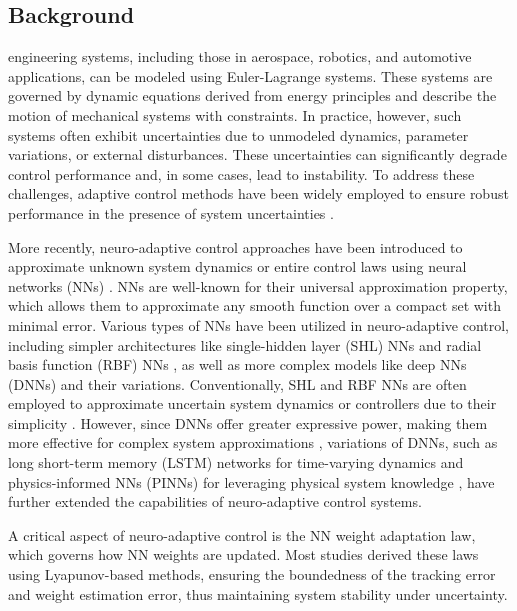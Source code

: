\documentclass[journal]{IEEEtran}
\begin{document}
\subsection{Background}

 engineering systems, including those in aerospace, robotics, and automotive applications, can be modeled using Euler-Lagrange systems. 
These systems are governed by dynamic equations derived from energy principles and describe the motion of mechanical systems with constraints. 
In practice, however, such systems often exhibit uncertainties due to unmodeled dynamics, parameter variations, or external disturbances. 
These uncertainties can significantly degrade control performance and, in some cases, lead to instability. 
To address these challenges, adaptive control methods have been widely employed to ensure robust performance in the presence of system uncertainties \cite{Ioannou:2006aa, Tao:2003aa}.

More recently, neuro-adaptive control approaches have been introduced to approximate unknown system dynamics or entire control laws using neural networks (NNs) \cite{Farrell:2006aa}. 
NNs are well-known for their universal approximation property, which allows them to approximate any smooth function over a compact set with minimal error. 
Various types of NNs have been utilized in neuro-adaptive control, including simpler architectures like single-hidden layer (SHL) NNs \cite{Ge:2010aa, Yesildirek:1995aa} and radial basis function (RBF) NNs \cite{Liu:2013ab,Ge:2002aa}, as well as more complex models like deep NNs (DNNs) \cite{Patil:2022aa} and their variations. 
Conventionally, SHL and RBF NNs are often employed to approximate uncertain system dynamics or controllers due to their simplicity \cite{Esfandiari:2014aa,Esfandiari:2015aa,Yesildirek:1995aa,Gao:2006aa}.
However, since DNNs offer greater expressive power, making them more effective for complex system approximations \cite{Rolnick:2018aa}, variations of DNNs, such as long short-term memory (LSTM) networks for time-varying dynamics \cite{Griffis:2023aa} and physics-informed NNs (PINNs) for leveraging physical system knowledge \cite{Hart:2024aa}, have further extended the capabilities of neuro-adaptive control systems.

A critical aspect of neuro-adaptive control is the NN weight adaptation law, which governs how NN weights are updated. 
Most studies derived these laws using Lyapunov-based methods, ensuring the boundedness of the tracking error and weight estimation error, thus maintaining system stability under uncertainty.
\end{document}
